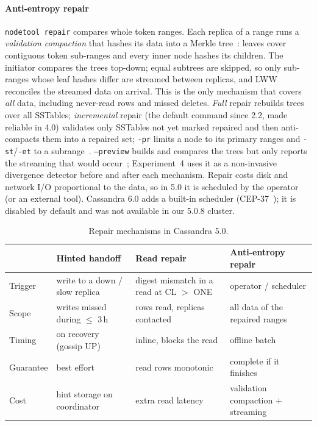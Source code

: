 \paragraph{Anti-entropy repair}
\texttt{nodetool repair} compares whole token ranges. Each replica of a range runs a
\emph{validation compaction} that hashes its data into a Merkle tree~\cite{merkle1987}:
leaves cover contiguous token sub-ranges and every inner node hashes its children. The
initiator compares the trees top-down; equal subtrees are skipped, so only sub-ranges whose
leaf hashes differ are streamed between replicas, and LWW reconciles the streamed data on
arrival. This is the only mechanism that covers \emph{all} data, including never-read rows
and missed deletes. \emph{Full} repair rebuilds trees over all SSTables; \emph{incremental}
repair (the default command since 2.2, made reliable in 4.0) validates only SSTables not yet
marked repaired and then anti-compacts them into a repaired set; \texttt{-pr} limits a node
to its primary ranges and \texttt{-st}/\texttt{-et} to a subrange~\cite{cassdoc-repair}.
\texttt{--preview} builds and compares the trees but only reports the streaming that would
occur~\cite{cass13257}; Experiment~4 uses it as a non-invasive divergence detector before
and after each mechanism. Repair costs disk and network I/O proportional to the data, so in
5.0 it is scheduled by the operator (or an external tool). Cassandra 6.0 adds a built-in
scheduler (CEP-37~\cite{cep37,cassdoc-autorepair}); it is disabled by default and was not
available in our 5.0.8 cluster.

\begin{table}[t]\centering\footnotesize
\caption{Repair mechanisms in Cassandra 5.0.}\label{tab:antientropy}
\begin{tabular}{@{}p{}p{}p{}p{}@{}}\hline
 & Hinted handoff & Read repair & Anti-entropy repair \\ \hline
Trigger & write to a down / slow replica & digest mismatch in a read at CL $>$ ONE & operator / scheduler \\
Scope & writes missed during $\le$ 3\,h & rows read, replicas contacted & all data of the repaired ranges \\
Timing & on recovery (gossip UP) & inline, blocks the read & offline batch \\
Guarantee & best effort & read rows monotonic & complete if it finishes \\
Cost & hint storage on coordinator & extra read latency & validation compaction + streaming \\ \hline
\end{tabular}
\end{table}

